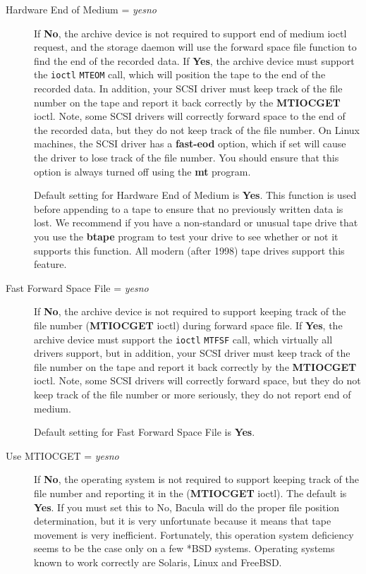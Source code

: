 \begin{description}
\item [Hardware End of Medium = {\it yes\vb{}no}]
   If {\bf No}, the archive device is not required to support end of medium
   ioctl request, and the storage daemon will use the forward space file
   function to find the end of the recorded data. If {\bf Yes}, the archive
   device must support the {\tt ioctl} {\tt MTEOM} call, which will position
   the tape to the end of the recorded data. In addition, your SCSI driver must
   keep track of the file number on the tape and report it back correctly by
   the {\bf MTIOCGET} ioctl. Note, some SCSI drivers will correctly forward
   space to the end of the recorded data, but they do not keep track of the
   file number.  On Linux machines, the SCSI driver has a {\bf fast-eod}
   option, which if set will cause the driver to lose track of the file
   number. You should ensure that this option is always turned off using the
   {\bf mt} program.
   
   Default setting for Hardware End of Medium is {\bf Yes}. This  function is
   used before appending to a tape to ensure that no  previously written data is
   lost. We recommend if you have a non-standard or unusual tape drive that you
   use the {\bf btape} program  to test your drive to see whether or not it
   supports this function.  All modern (after 1998) tape drives support this
   feature.  
   
\item [Fast Forward Space File = {\it yes\vb{}no}]
   If {\bf No}, the archive device is not required to support  keeping track of
   the file number ({\bf MTIOCGET} ioctl) during  forward space file. If {\bf
   Yes}, the archive device must support  the {\tt ioctl} {\tt MTFSF} call, which
   virtually all drivers  support, but in addition, your SCSI driver must keep
   track of the  file number on the tape and report it back correctly by the 
   {\bf MTIOCGET} ioctl. Note, some SCSI drivers will correctly  forward space,
   but they do not keep track of the file number or more  seriously, they do not
   report end of medium.  
   
   Default setting for Fast Forward Space File is {\bf Yes}.
   
\item [Use MTIOCGET = {\it yes\vb{}no}]
   If {\bf No}, the operating system is not required to support keeping track of
   the file number and reporting it in the ({\bf MTIOCGET} ioctl). The default
   is {\bf Yes}. If you must set this to No, Bacula will do the proper file
   position determination, but it is very unfortunate because it means that 
   tape movement is very inefficient.
   Fortunately, this operation system deficiency seems to be the case only
   on a few *BSD systems.  Operating systems known to work correctly are
   Solaris, Linux and FreeBSD.


\end{description}
